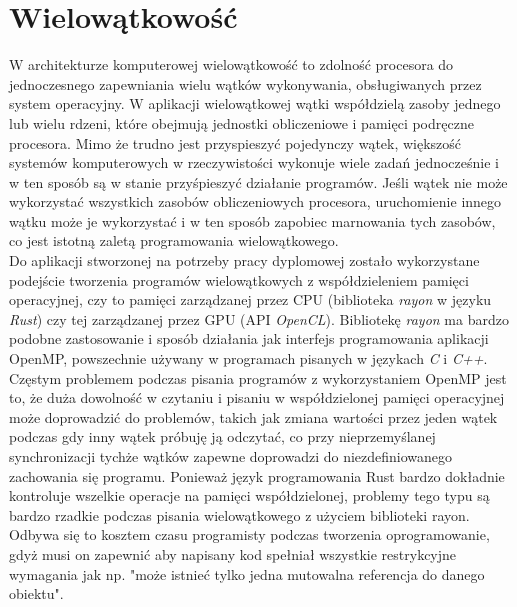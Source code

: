 \documentclass[12pt, letterpaper]{report}
\begin{document}
    \section{Wielowątkowość}

    W architekturze komputerowej wielowątkowość to zdolność procesora do 
    jednoczesnego zapewniania wielu wątków wykonywania, obsługiwanych przez 
    system operacyjny. W aplikacji wielowątkowej wątki współdzielą zasoby 
    jednego lub wielu rdzeni, które obejmują jednostki obliczeniowe i pamięci 
    podręczne procesora. Mimo że trudno jest przyspieszyć pojedynczy wątek, 
    większość systemów komputerowych w rzeczywistości wykonuje wiele zadań jednocześnie i 
    w ten sposób są w stanie przyśpieszyć działanie programów. Jeśli wątek nie może wykorzystać 
    wszystkich zasobów obliczeniowych procesora, uruchomienie innego wątku może je wykorzystać i 
    w ten sposób zapobiec marnowania tych zasobów, co jest istotną zaletą programowania wielowątkowego. \\

    Do aplikacji stworzonej na potrzeby pracy dyplomowej zostało wykorzystane podejście 
    tworzenia programów wielowątkowych z współdzieleniem pamięci operacyjnej, 
    czy to pamięci zarządzanej przez CPU (biblioteka \emph{rayon} w języku \emph{Rust}) 
    czy tej zarządzanej przez GPU (API \emph{OpenCL}).
    Bibliotekę \emph{rayon} ma bardzo podobne zastosowanie 
    i sposób działania jak interfejs programowania aplikacji 
    OpenMP, powszechnie używany w programach pisanych w językach \emph{C} i \emph{C++}.
    Częstym problemem podczas pisania programów z wykorzystaniem OpenMP jest to, że duża 
    dowolność w czytaniu i pisaniu w 
    współdzielonej pamięci operacyjnej może doprowadzić do problemów, takich jak
    zmiana wartości przez jeden wątek podczas gdy inny wątek próbuję ją odczytać, co 
    przy nieprzemyślanej synchronizacji tychże wątków zapewne doprowadzi do niezdefiniowanego
    zachowania się programu.
    Ponieważ język programowania Rust bardzo dokładnie kontroluje wszelkie operacje na pamięci 
    współdzielonej, problemy tego typu są bardzo rzadkie podczas pisania wielowątkowego z
    użyciem biblioteki rayon. Odbywa się to kosztem czasu programisty podczas tworzenia 
    oprogramowanie, gdyż musi on zapewnić aby napisany kod spełniał wszystkie restrykcyjne 
    wymagania jak np. "może istnieć tylko jedna mutowalna referencja do danego obiektu". \\
\end{document}
